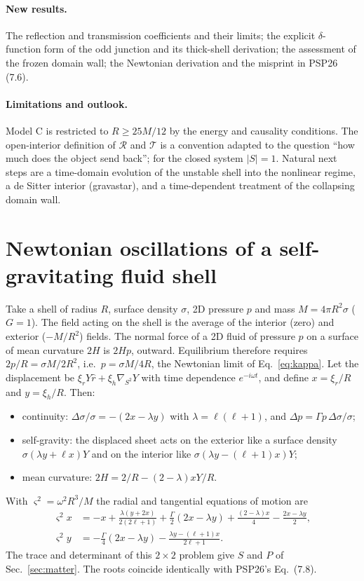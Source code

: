 \documentclass[11pt,a4paper]{article}
\numberwithin{equation}{section}
\newcommand{\RR}{\mathcal R}
\newcommand{\TT}{\mathcal T}
\begin{document}
\paragraph{New results.} The reflection and transmission coefficients and their limits; the explicit $\delta$-function
form of the odd junction and its thick-shell derivation; the assessment of the frozen domain wall; the Newtonian
derivation and the misprint in PSP26 (7.6).
\paragraph{Limitations and outlook.} Model C is restricted to $R\ge25M/12$ by the energy and causality conditions. The
open-interior definition of $\RR$ and $\TT$ is a convention adapted to the question ``how much does the object send
back''; for the closed system $|S|=1$. Natural next steps are a time-domain evolution of the unstable shell into the
nonlinear regime, a de Sitter interior (gravastar), and a time-dependent treatment of the collapsing domain wall.

\appendix
\section{Newtonian oscillations of a self-gravitating fluid shell}\label{app:newton}
Take a shell of radius $R$, surface density $\sigma$, 2D pressure $p$ and mass $M=4\pi R^2\sigma$ ($G=1$). The field acting
on the shell is the average of the interior (zero) and exterior ($-M/R^2$) fields. The normal force of a 2D fluid of
pressure $p$ on a surface of mean curvature $2H$ is $2Hp$, outward. Equilibrium therefore requires
$2p/R=\sigma M/2R^2$, i.e.\ $p=\sigma M/4R$, the Newtonian limit of Eq.~\eqref{eq:kappa}. Let the displacement be
$\xi_rY\hat r+\xi_h\nabla_{S^2}Y$ with time dependence $e^{-i\omega t}$, and define $x=\xi_r/R$ and $y=\xi_h/R$. Then:
\begin{itemize}
\item continuity: $\Delta\sigma/\sigma=-(2x-\lambda y)$ with $\lambda=\ell(\ell+1)$, and $\Delta p=\Gamma p\,\Delta\sigma/\sigma$;
\item self-gravity: the displaced sheet acts on the exterior like a surface density $\sigma(\lambda y+\ell x)Y$ and on the
interior like $\sigma(\lambda y-(\ell+1)x)Y$;
\item mean curvature: $2H=2/R-(2-\lambda)xY/R$.
\end{itemize}
With $\varsigma^2=\omega^2R^3/M$ the radial and tangential equations of motion are
\begin{align}
\varsigma^2x&=-x+\frac{\lambda(y+2x)}{2(2\ell+1)}+\frac\Gamma2(2x-\lambda y)+\frac{(2-\lambda)x}{4}-\frac{2x-\lambda y}{2},\\
\varsigma^2y&=-\frac\Gamma4(2x-\lambda y)-\frac{\lambda y-(\ell+1)x}{2\ell+1}.
\end{align}
The trace and determinant of this $2\times2$ problem give $S$ and $P$ of Sec.~\ref{sec:matter}. The roots coincide
identically with PSP26's Eq.~(7.8).
\end{document}
